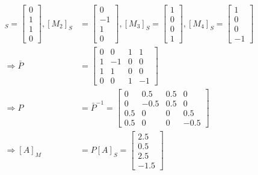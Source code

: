 \documentclass{article}
\theoremstyle{definition} %
\begin{document}
\begin{align*}
    [M_1]_S = 
    \begin{bmatrix}
        0 \\ 1 \\ 1 \\ 0
    \end{bmatrix},
    [M_2]_S &= 
    \begin{bmatrix}
        0 \\ -1 \\ 1 \\ 0
    \end{bmatrix},
    [M_3]_S = 
    \begin{bmatrix}
        1 \\ 0 \\ 0 \\ 1
    \end{bmatrix},
    [M_4]_S = 
    \begin{bmatrix}
        1 \\ 0 \\ 0 \\ -1
    \end{bmatrix}
    \\
    \Rightarrow
    \bar P &= 
    \begin{bmatrix}
        0 & 0 & 1 & 1\\
        1 & -1 & 0 & 0 \\
        1 & 1 & 0 & 0\\
        0 & 0 & 1 & -1
    \end{bmatrix}
    \\
    \Rightarrow
    P &= \bar{P}^{-1} =
    \begin{bmatrix}
        0 & 0.5 & 0.5 & 0\\
        0 & -0.5 & 0.5 & 0 \\
        0.5 & 0 & 0 & 0.5\\
        0.5 & 0 & 0 & -0.5
    \end{bmatrix}
    \\
    \Rightarrow
    [A]_M &= P[A]_S = 
    \begin{bmatrix}
        2.5 \\ 0.5 \\ 2.5 \\ -1.5
    \end{bmatrix}
\end{align*}

\section{}
\end{document}
